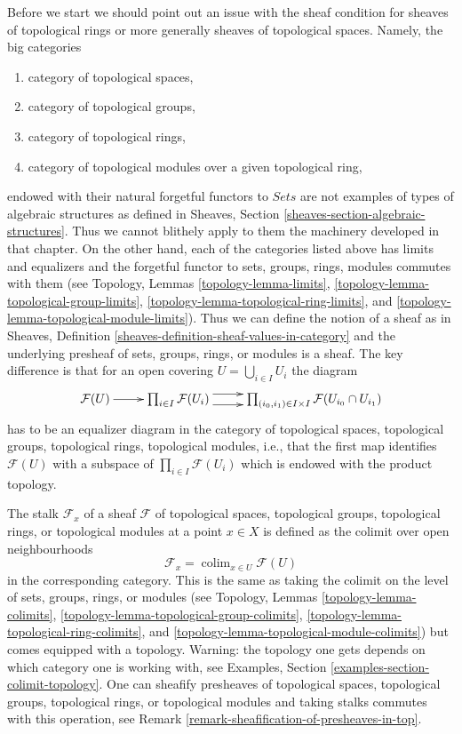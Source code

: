 \documentclass{stacks-project}
\theoremstyle{plain}
\theoremstyle{definition}
\theoremstyle{remark}
\numberwithin{equation}{subsection}
\def\colim{\mathop{\mathrm{colim}}\nolimits}
\begin{document}
\medskip\noindent
Before we start we should point out an issue with the sheaf condition
for sheaves of topological rings or more generally sheaves of topological
spaces. Namely, the big categories
\begin{enumerate}
\item category of topological spaces,
\item category of topological groups,
\item category of topological rings,
\item category of topological modules over a given topological ring,
\end{enumerate}
endowed with their natural forgetful functors to $\textit{Sets}$ are not
examples of types of algebraic structures as defined in
Sheaves, Section \ref{sheaves-section-algebraic-structures}.
Thus we cannot blithely apply to them the machinery developed in that
chapter. On the other hand, each of the categories
listed above has limits and equalizers and the forgetful functor
to sets, groups, rings, modules commutes with them
(see Topology, Lemmas \ref{topology-lemma-limits},
\ref{topology-lemma-topological-group-limits},
\ref{topology-lemma-topological-ring-limits}, and
\ref{topology-lemma-topological-module-limits}).
Thus we can define the notion of a
sheaf as in Sheaves, Definition
\ref{sheaves-definition-sheaf-values-in-category}
and the underlying presheaf of sets, groups, rings, or modules
is a sheaf. The key difference is that for an open covering
$U = \bigcup_{i \in I} U_i$ the diagram
$$
\xymatrix{
\mathcal{F}(U) \ar[r]
&
\prod\nolimits_{i\in I}
\mathcal{F}(U_i)
\ar@<1ex>[r] \ar@<-1ex>[r]
&
\prod\nolimits_{(i_0, i_1) \in I \times I}
\mathcal{F}(U_{i_0} \cap U_{i_1})
}
$$
has to be an equalizer diagram in the category of topological
spaces, topological groups, topological rings, topological modules,
i.e., that the first map identifies
$\mathcal{F}(U)$ with a subspace of $\prod_{i \in I} \mathcal{F}(U_i)$
which is endowed with the product topology.

\medskip\noindent
The stalk $\mathcal{F}_x$ of a sheaf $\mathcal{F}$
of topological spaces, topological groups, topological rings, or
topological modules at a point $x \in X$ is defined as the colimit over
open neighbourhoods
$$
\mathcal{F}_x = \colim_{x\in U} \mathcal{F}(U)
$$
in the corresponding category. This is the same as taking
the colimit on the level of sets, groups, rings, or modules
(see Topology, Lemmas \ref{topology-lemma-colimits},
\ref{topology-lemma-topological-group-colimits},
\ref{topology-lemma-topological-ring-colimits}, and
\ref{topology-lemma-topological-module-colimits})
but comes equipped with a topology. Warning:
the topology one gets depends on which category one is working with, see
Examples, Section \ref{examples-section-colimit-topology}.
One can sheafify presheaves of topological spaces,
topological groups, topological rings, or topological modules
and taking stalks commutes with this operation, see
Remark \ref{remark-sheafification-of-presheaves-in-top}.
\end{document}
